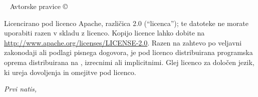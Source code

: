 \newpage
\begin{fullwidth}
~\vfill
\thispagestyle{empty}
\setlength{\parindent}{0pt}
\setlength{\parskip}{\baselineskip}
Avtorske pravice \copyright\ \the\year\ \thanklessauthor

\par{}

\par{}

\par Licencirano pod licenco Apache, različica 2.0 (``licenca''); te datoteke ne morate uporabiti razen v skladu z licenco. Kopijo licence lahko dobite na \url{http://www.apache.org/licenses/LICENSE-2.0}. Razen
na zahtevo po veljavni zakonodaji ali podlagi pisnega dogovora, je pod licenco distribuirana programska oprema distribuirana na , izrecnimi ali implicitnimi. Glej
licenco za določen jezik, ki ureja dovoljenja in omejitve pod licenco.

\par\textit{Prvi natis, \monthyear}
\end{fullwidth}

